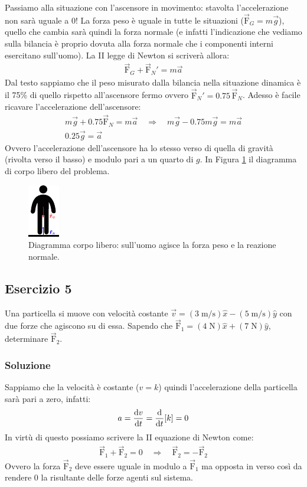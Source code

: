 \documentclass[12pt,a4paper]{book}
\begin{document}
Passiamo alla situazione con l'ascensore in movimento: stavolta l'accelerazione non sarà uguale a 0! La forza peso è uguale in tutte le situazioni ($\vec{\text{F}}_G=m\vec{g}$), quello che cambia sarà quindi la forza normale (e infatti l'indicazione che vediamo sulla bilancia è proprio dovuta alla forza normale che i componenti interni esercitano sull'uomo). La II legge di Newton si scriverà allora:
%
\begin{gather*}
\vec{\text{F}}_G+\vec{\text{F}}_N'=m\vec{a}
\end{gather*}
%
Dal testo sappiamo che il peso misurato dalla bilancia nella situazione dinamica è il 75\% di quello rispetto all'ascensore fermo ovvero $\vec{\text{F}}_N'=0.75\,\vec{\text{F}}_N$. Adesso è facile ricavare l'accelerazione dell'ascensore:
%
\begin{gather*}
m\vec{g}+0.75\vec{\text{F}}_N=m\vec{a} \quad \Longrightarrow \quad m\vec{g}-0.75m\vec{g}=m\vec{a} \\
0.25\vec{g}=\vec{a}
\end{gather*}
%
Ovvero l'accelerazione dell'ascensore ha lo stesso verso di quella di gravità (rivolta verso il basso) e modulo pari a un quarto di $g$. In Figura \ref{fig:4-e-4} il diagramma di corpo libero del problema.

\begin{figure}[!ht]
\centering
\includegraphics[scale=3]{e-4.pdf}
\caption{Diagramma corpo libero: sull'uomo agisce la forza peso e la reazione normale.} 
\label{fig:4-e-4} 
\end{figure}

\subsection*{Esercizio 5}
Una particella si muove con velocità costante $\vec{v}= (3\;\text{m/s})\hat{x} - (5\;\text{m/s})\hat{y}$ con due forze che agiscono su di essa. Sapendo che $\vec{\text{F}}_1=(4\;\text{N})\hat{x} + (7\;\text{N})\hat{y}$, determinare $\vec{\text{F}}_2$.

\subsubsection*{Soluzione}
Sappiamo che la velocità è costante ($v=k$) quindi l'accelerazione della particella sarà pari a zero, infatti:
%
\begin{gather*}
a=\dv{v}{t}=\dv{t}[k]=0
\end{gather*}
%
In virtù di questo possiamo scrivere la II equazione di Newton come:
%
\begin{gather*}
\vec{\text{F}}_1+\vec{\text{F}}_2=0 \quad \Longrightarrow \quad \vec{\text{F}}_2=-\vec{\text{F}}_2
\end{gather*}
%
Ovvero la forza $\vec{\text{F}}_2$ deve essere uguale in modulo a $\vec{\text{F}}_1$ ma opposta in verso così da rendere 0 la risultante delle forze agenti sul sistema.
\end{document}
